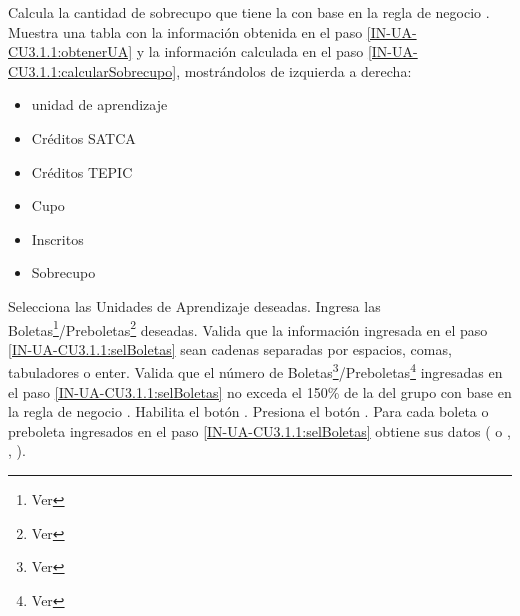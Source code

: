 \begin{UCtrayectoria}
    \UCpaso  \label{IN-UA-CU3.1.1:calcularSobrecupo}Calcula la cantidad de sobrecupo que tiene la  con base en la regla de negocio .
    \UCpaso Muestra una tabla con la información obtenida en el paso \ref{IN-UA-CU3.1.1:obtenerUA} y la información calculada en el paso \ref{IN-UA-CU3.1.1:calcularSobrecupo}, mostrándolos de izquierda a derecha:
	    \begin{itemize}
	    	\item unidad de aprendizaje
	    	\item Créditos SATCA
	    	\item Créditos TEPIC
	    	\item Cupo
	    	\item Inscritos
	    	\item Sobrecupo
	    \end{itemize}
    \UCpaso[\UCactor]  \label{IN-UA-CU3.1.1:selUA}Selecciona las Unidades de Aprendizaje deseadas.
    \UCpaso[\UCactor]  \label{IN-UA-CU3.1.1:selBoletas}Ingresa las Boletas\footnote{Ver }/Preboletas\footnote{Ver } deseadas.
    \UCpaso Valida que la información ingresada en el paso \ref{IN-UA-CU3.1.1:selBoletas} sean cadenas separadas por espacios, comas, tabuladores o enter.
    \UCpaso Valida que el número de Boletas\footnote{Ver }/Preboletas\footnote{Ver } ingresadas en el paso \ref{IN-UA-CU3.1.1:selBoletas} no exceda el 150\% de la  del grupo con base en la regla de negocio .
    \UCpaso Habilita el botón .
    \UCpaso[\UCactor] \label{IN-UA-CU3.1.1:agregarAlGrupo}Presiona el botón .
    \UCpaso \label{IN-UA-CU3.1.1:obtenerEstudiante}Para cada boleta o preboleta ingresados en el paso \ref{IN-UA-CU3.1.1:selBoletas} obtiene sus datos ( o , , ).

\end{UCtrayectoria}
